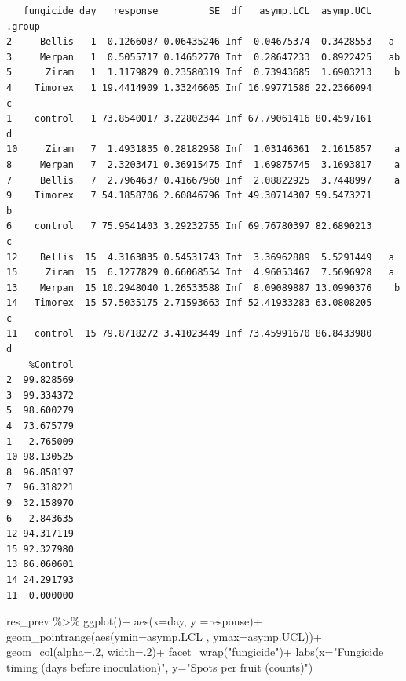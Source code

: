 \documentclass[
  letterpaper,
  DIV=11,
  numbers=noendperiod]{scrreport}
\newenvironment{Shaded}{\begin{snugshade}}{\end{snugshade}}
\newcommand{\AttributeTok}[1]{\textcolor[rgb]{0.40,0.45,0.13}{#1}}
\newcommand{\DecValTok}[1]{\textcolor[rgb]{0.68,0.00,0.00}{#1}}
\newcommand{\FunctionTok}[1]{\textcolor[rgb]{0.28,0.35,0.67}{#1}}
\newcommand{\NormalTok}[1]{\textcolor[rgb]{0.00,0.23,0.31}{#1}}
\newcommand{\SpecialCharTok}[1]{\textcolor[rgb]{0.37,0.37,0.37}{#1}}
\newcommand{\StringTok}[1]{\textcolor[rgb]{0.13,0.47,0.30}{#1}}
\begin{document}
\begin{verbatim}
   fungicide day   response         SE  df   asymp.LCL  asymp.UCL .group
2     Bellis   1  0.1266087 0.06435246 Inf  0.04675374  0.3428553   a   
3     Merpan   1  0.5055717 0.14652770 Inf  0.28647233  0.8922425   ab  
5      Ziram   1  1.1179829 0.23580319 Inf  0.73943685  1.6903213    b  
4    Timorex   1 19.4414909 1.33246605 Inf 16.99771586 22.2366094     c 
1    control   1 73.8540017 3.22802344 Inf 67.79061416 80.4597161      d
10     Ziram   7  1.4931835 0.28182958 Inf  1.03146361  2.1615857    a  
8     Merpan   7  2.3203471 0.36915475 Inf  1.69875745  3.1693817    a  
7     Bellis   7  2.7964637 0.41667960 Inf  2.08822925  3.7448997    a  
9    Timorex   7 54.1858706 2.60846796 Inf 49.30714307 59.5473271     b 
6    control   7 75.9541403 3.29232755 Inf 69.76780397 82.6890213      c
12    Bellis  15  4.3163835 0.54531743 Inf  3.36962889  5.5291449   a   
15     Ziram  15  6.1277829 0.66068554 Inf  4.96053467  7.5696928   a   
13    Merpan  15 10.2948040 1.26533588 Inf  8.09089887 13.0990376    b  
14   Timorex  15 57.5035175 2.71593663 Inf 52.41933283 63.0808205     c 
11   control  15 79.8718272 3.41023449 Inf 73.45991670 86.8433980      d
    %Control
2  99.828569
3  99.334372
5  98.600279
4  73.675779
1   2.765009
10 98.130525
8  96.858197
7  96.318221
9  32.158970
6   2.843635
12 94.317119
15 92.327980
13 86.060601
14 24.291793
11  0.000000
\end{verbatim}

\begin{Shaded}
\begin{Highlighting}[]
\NormalTok{res\_prev }\SpecialCharTok{\%\textgreater{}\%} 
  \FunctionTok{ggplot}\NormalTok{()}\SpecialCharTok{+}
  \FunctionTok{aes}\NormalTok{(}\AttributeTok{x=}\NormalTok{day, }\AttributeTok{y =}\NormalTok{response)}\SpecialCharTok{+}
  \FunctionTok{geom\_pointrange}\NormalTok{(}\FunctionTok{aes}\NormalTok{(}\AttributeTok{ymin=}\NormalTok{asymp.LCL , }\AttributeTok{ymax=}\NormalTok{asymp.UCL))}\SpecialCharTok{+}
  \FunctionTok{geom\_col}\NormalTok{(}\AttributeTok{alpha=}\NormalTok{.}\DecValTok{2}\NormalTok{, }\AttributeTok{width=}\NormalTok{.}\DecValTok{2}\NormalTok{)}\SpecialCharTok{+}
  \FunctionTok{facet\_wrap}\NormalTok{(}\StringTok{"fungicide"}\NormalTok{)}\SpecialCharTok{+}
    \FunctionTok{labs}\NormalTok{(}\AttributeTok{x=}\StringTok{"Fungicide timing (days before inoculation)"}\NormalTok{, }
         \AttributeTok{y=}\StringTok{"Spots per fruit (counts)"}\NormalTok{)}
\end{Highlighting}
\end{Shaded}
\end{document}
